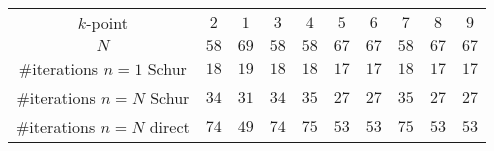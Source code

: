 \begin{tabular}{cccccccccc}
$k$-point & $2$ & $1$ & $3$ & $4$ & $5$ & $6$ & $7$ & $8$ & $9$\\
$N$ & $58$ & $69$ & $58$ & $58$ & $67$ & $67$ & $58$ & $67$ & $67$\\
\#iterations $n=1$ Schur & $18$ & $19$ & $18$ & $18$ & $17$ & $17$ & $18$ & $17$ & $17$\\
\#iterations $n=N$ Schur & $34$ & $31$ & $34$ & $35$ & $27$ & $27$ & $35$ & $27$ & $27$\\
\#iterations $n=N$ direct & $74$ & $49$ & $74$ & $75$ & $53$ & $53$ & $75$ & $53$ & $53$\\
\end{tabular}
